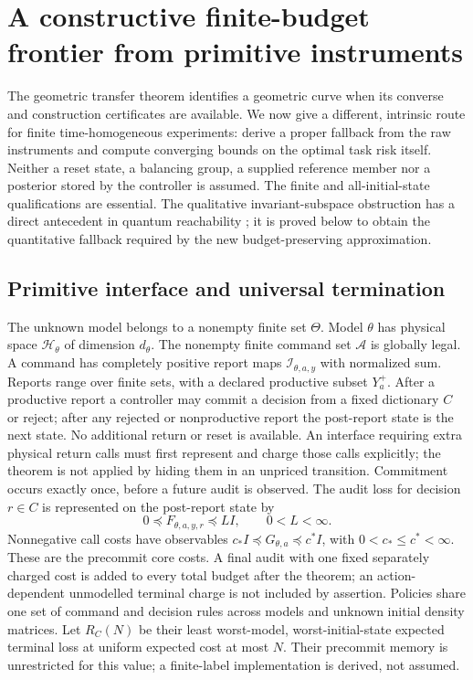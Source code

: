 \section{A constructive finite-budget frontier from primitive instruments}\label{sec:primitive-risk}
The geometric transfer theorem identifies a geometric curve when its converse and construction certificates are available. We now give a different, intrinsic route for finite time-homogeneous experiments: derive a proper fallback from the raw instruments and compute converging bounds on the optimal task risk itself. Neither a reset state, a balancing group, a supplied reference member nor a posterior stored by the controller is assumed. The finite and all-initial-state qualifications are essential. The qualitative invariant-subspace obstruction has a direct antecedent in quantum reachability \cite[Theorem 3.6]{Ying14pre}; it is proved below to obtain the quantitative fallback required by the new budget-preserving approximation.

\subsection{Primitive interface and universal termination}
The unknown model belongs to a nonempty finite set $\Theta$. Model $\theta$ has physical space $\mathcal H_\theta$ of dimension $d_\theta$. The nonempty finite command set $\mathcal A$ is globally legal. A command has completely positive report maps $\mathcal I_{\theta,a,y}$ with normalized sum. Reports range over finite sets, with a declared productive subset $Y_a^+$. After a productive report a controller may commit a decision from a fixed dictionary $C$ or reject; after any rejected or nonproductive report the post-report state is the next state. No additional return or reset is available. An interface requiring extra physical return calls must first represent and charge those calls explicitly; the theorem is not applied by hiding them in an unpriced transition. Commitment occurs exactly once, before a future audit is observed. The audit loss for decision $r\in C$ is represented on the post-report state by
\[
 0\preccurlyeq F_{\theta,a,y,r}\preccurlyeq LI,
 \qquad 0<L<\infty.
\]
Nonnegative call costs have observables $c_*I\preccurlyeq G_{\theta,a}\preccurlyeq c^*I$, with $0<c_*\le c^*<\infty$. These are the precommit core costs. A final audit with one fixed separately charged cost is added to every total budget after the theorem; an action-dependent unmodelled terminal charge is not included by assertion. Policies share one set of command and decision rules across models and unknown initial density matrices. Let $R_C(N)$ be their least worst-model, worst-initial-state expected terminal loss at uniform expected cost at most $N$. Their precommit memory is unrestricted for this value; a finite-label implementation is derived, not assumed.

